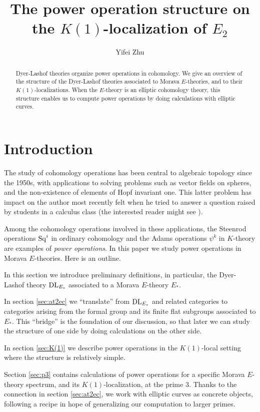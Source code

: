\documentclass{gtpart}
\title{The power operation structure on the $K(1)$-localization of $E_2$}
\author{Yifei Zhu}
\theoremstyle{definition}
\theoremstyle{remark}
\newcommand{\DL}{{\rm DL}}
\begin{document}
\begin{abstract}
 Dyer-Lashof theories organize power operations in cohomology.  We give an 
 overview of the structure of the Dyer-Lashof theories associated to Morava 
 $E$-theories, and to their $K(1)$-localizations.  When the $E$-theory is an 
 elliptic cohomology theory, this structure enables us to compute power 
 operations by doing calculations with elliptic curves.  
\end{abstract}


\maketitle
\section{Introduction}
\label{sec:intro}

The study of cohomology operations has been central to algebraic topology 
since the 1950s, with applications to solving problems such as vector fields 
on spheres, and the non-existence of elements of Hopf invariant one.  This 
latter problem has impact on the author most recently felt when he tried to 
answer a question raised by students in a calculus class (the interested 
reader might see \cite[theorem II]{massey}).  

Among the cohomology operations involved in these applications, the Steenrod 
operations ${\rm Sq}^i$ in ordinary cohomology and the Adams operations 
$\psi^k$ in $K$-theory are examples of {\em power operations}.  In this paper 
we study power operations in Morava $E$-theories.  Here is an outline.  

In this section we introduce preliminary definitions, in particular, the 
Dyer-Lashof theory $\DL_{E_*}$ associated to a Morava $E$-theory $E_*$.  

In section \ref{sec:at2ec} we ``translate'' from $\DL_{E_*}$ and related 
categories to categories arising from the formal group and its finite flat 
subgroups associated to $E_*$.  This ``bridge'' is the foundation of our 
discussion, so that later we can study the structure of one side by doing 
calculations on the other side.  

In section \ref{sec:K(1)} we describe power operations in the $K(1)$-local 
setting where the structure is relatively simple.  

Section \ref{sec:p3} contains calculations of power operations for a specific 
Morava $E$-theory spectrum, and its $K(1)$-localization, at the prime 3.  
Thanks to the connection in section \ref{sec:at2ec}, we work with elliptic 
curves as concrete objects, following a recipe in hope of generalizing our 
computation to larger primes.  
\end{document}
